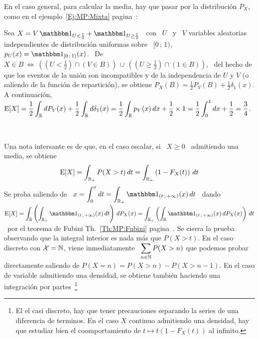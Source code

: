{En el caso general, para calcular  la media, hay que pasar por la distribuci\'on
$P_X$, como en el ejemplo~\ref{Ej:MP:Mixta}  pagina~\pageref{Ej:MP:Mixta}:
%
\begin{ejemplo}\label{Ej:MP:EspMixta}
  Sea $X = V \,  \un_{U < \frac12} + \un_{U \ge \frac12}$ \ con  \ $U$ \ y \ $V$
  variables aleatorias independientes de distribuci\'on uniformas sobre \ $[0 \,
  ;  \, 1)$,  \ie  $p_U(x) =  \un_{[0  \, ;  \,  1)}(x)$. \  De \  $X  \in B  \:
  \Leftrightarrow  \: \left(  \left( U  < \frac12  \right) \cap  \left( V  \in B
    \right) \right) \, \cup \, \left( \left( U \ge \frac12 \right) \cap \left( 1
      \in B \right) \right)$,  \ del hecho de que los eventos  de la uni\'on son
  incompatibles y de  la independencia de $U$ y $V$ (o  saliendo de la funci\'on
  de repartici\'on), se obtiene $P_X(B) = \frac12 P_V(B) + \frac12 \delta_1(x)$.
  A  continuaci\'on, \  $\displaystyle \operatorname{E}[X]  = \frac12  \int_{\mathbb{R}}  dP_V(x) +
  \frac12 \int_{\mathbb{R}}  d\delta_1(x) = \frac12  \int_{\mathbb{R}} p_V(x) \, dx  + \frac12
  \times 1 = \frac12 \int_0^1 dx + \frac12 = \frac34$.
\end{ejemplo}

\

Una nota intersante es  de que, en el caso escalar, si \  $X \ge 0$ \ admitiendo
una media, se obtiene
%
\[
\operatorname{E}[X]  = \int_{\mathbb{R}_+} P(X  > t)  \, dt  = \int_{\mathbb{R}_+}  \left( 1  - F_X(t)
\right) \, dt
\]
%
Se proba saliendo  de \ $\displaystyle x = \int_0^x  dt = \int_{\Rset_+} \un_{(t
  \, ;  \, +\infty)}(x)  \, dt$  \ dando \  $\displaystyle \Esp[X]  = \int_\Rset
\left( \int_{\Rset_+}  \un_{(t \, ; \,  +\infty)}(x) \, dt \right)  \, dP_X(x) =
\int_{\Rset_+} \left( \int_\Rset \un_{(t \, ; \, +\infty)}(x) \, dP_X(x) \right)
\,    dt$    \    por    el    teorema    de    Fubini    Th.~\ref{Th:MP:Fubini}
pagina~\pageref{Th:MP:Fubini}. Se  cierra la  prueba observando que  la integral
interior es nada  m\'as que $P(X > t)$.   En el caso discreto con  $\mathcal{X} = \mathbb{N}$,
viene  inmediatamente \ $\displaystyle  \sum_{n \in  \mathbb{N}} P(X>n)$  que podemos
probar directamente  saliendo de $P(X  = n) =  P(X>n)- P(X>n-1)$. En el  caso de
variable   admitiendo  una   densidad,   se  obtiene   tambi\'en  haciendo   una
integraci\'on  por   partes~\footnote{El  el   casi  discreto,  hay   que  tener
  precauciones separando la series de una diferencia de terminos. En el caso $X$
  continuo admitiendo una densidad, hay  que estudiar bien el coomportamiento de
  $t \mapsto t (1-F_X(t))$ al infinito.}

}
